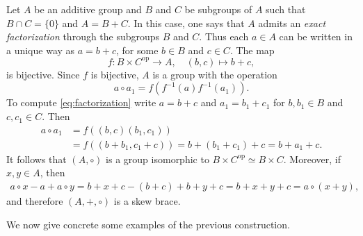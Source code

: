 \begin{example}
    \label{exa:WX}
   Let $A$ be an additive group
	and $B$ and $C$ be subgroups of $A$ such that $B\cap C=\{ 0\}$ and $A=B+C$. In this case, one says that $A$ admits an {\em exact factorization} through the subgroups $B$ and $C$.  Thus each $a\in A$ can be written in a unique
	way as $a=b+c$, for some $b\in B$ and $c\in C$.  The map
    \[
        f\colon B\times C^{\mathrm{op}}\to A,\quad
		(b,c)\mapsto b+c,
	\]
	is bijective. Since $f$ is bijective, 
	$A$ is a group with the operation
	\begin{equation}
	\label{eq:factorization}
	a\circ a_1=f\left(f^{-1}(a)f^{-1}(a_1)\right).
	\end{equation}
	To compute \eqref{eq:factorization} write $a=b+c$ and 
	$a_1=b_1+c_1$ for $b,b_1\in B$ and $c,c_1\in C$. 
	Then 
	\begin{align*}
	a\circ a_1&=f\left((b,c)(b_1,c_1)\right)\\
	&=f\left((b+b_1,c_1+c)\right)
	=b+(b_1+c_1)+c=b+a_1+c.
	\end{align*}
	It follows that $(A,\circ)$ is a group 
	isomorphic to $B\times C^{\mathrm{op}}\simeq B\times C$. Moreover, if $x,y\in A$, 
	then 
	\begin{align*}
	a\circ x-a+a\circ y=b+x+c-(b+c)+b+y+c=b+x+y+c=a\circ (x+y),
	\end{align*}
	and therefore $(A,+,\circ)$ is a skew brace. 
\end{example}


We now give concrete some examples of the previous construction. 

